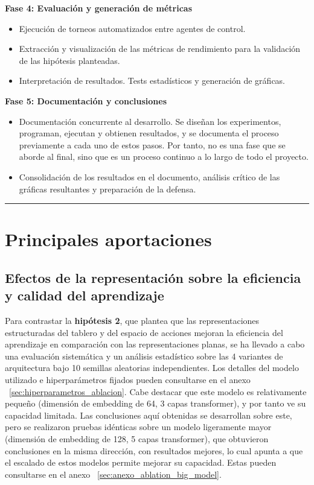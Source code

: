 \documentclass[12pt, a4paper]{article}
\begin{document}
\textbf{Fase 4: Evaluación y generación de métricas}

\begin{itemize}
    \item Ejecución de torneos automatizados entre agentes de control.
    \item Extracción y visualización de las métricas de rendimiento para la validación de las hipótesis planteadas.
    \item Interpretación de resultados. Tests estadísticos y generación de gráficas. 
\end{itemize}

\textbf{Fase 5: Documentación y conclusiones}

\begin{itemize}
    \item Documentación concurrente al desarrollo. Se diseñan los experimentos, programan, ejecutan y obtienen resultados, y se documenta el proceso previamente a cada uno de estos pasos. Por tanto, no es una fase que se aborde al final, sino que es un proceso continuo a lo largo de todo el proyecto.
    \item Consolidación de los resultados en el documento, análisis crítico de las gráficas resultantes y preparación de la defensa.
\end{itemize}

\rule{\textwidth}{0.2pt}
\section{Principales aportaciones}\label{sec:aportaciones}

\subsection{Efectos de la representación sobre la eficiencia y calidad del aprendizaje} \label{sec:representation_results}

Para contrastar la \textbf{hipótesis 2}, que plantea que las representaciones estructuradas del tablero y del espacio de acciones mejoran la eficiencia del aprendizaje en comparación con las representaciones planas, se ha llevado a cabo una evaluación sistemática y un análisis estadístico sobre las 4 variantes de arquitectura bajo 10 semillas aleatorias independientes. Los detalles del modelo utilizado e hiperparámetros fijados pueden consultarse en el anexo ~\ref{sec:hiperparametros_ablacion}. 
Cabe destacar que este modelo es relativamente pequeño (dimensión de embedding de 64, 3 capas transformer), y por tanto ve su capacidad limitada. Las conclusiones aquí obtenidas se desarrollan sobre este, pero se realizaron pruebas idénticas sobre un modelo ligeramente mayor (dimensión de embedding de 128, 5 capas transformer), que obtuvieron conclusiones en la misma dirección, con resultados mejores, lo cual apunta a que el escalado de estos modelos permite mejorar su capacidad. Estas pueden consultarse en el anexo ~\ref{sec:anexo_ablation_big_model}.
\end{document}
